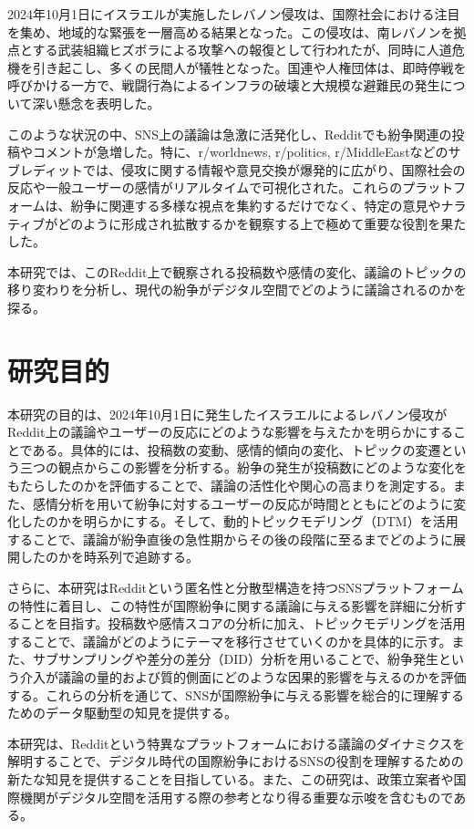 \documentclass[11pt, a4j]{jreport}
\begin{document}
    2024年10月1日にイスラエルが実施したレバノン侵攻は、国際社会における注目を集め、地域的な緊張を一層高める結果となった。この侵攻は、南レバノンを拠点とする武装組織ヒズボラによる攻撃への報復として行われたが、同時に人道危機を引き起こし、多くの民間人が犠牲となった。国連や人権団体は、即時停戦を呼びかける一方で、戦闘行為によるインフラの破壊と大規模な避難民の発生について深い懸念を表明した。

    このような状況の中、SNS上の議論は急激に活発化し、Redditでも紛争関連の投稿やコメントが急増した。特に、r/worldnews, r/politics, r/MiddleEastなどのサブレディットでは、侵攻に関する情報や意見交換が爆発的に広がり、国際社会の反応や一般ユーザーの感情がリアルタイムで可視化された。これらのプラットフォームは、紛争に関連する多様な視点を集約するだけでなく、特定の意見やナラティブがどのように形成され拡散するかを観察する上で極めて重要な役割を果たした。

    本研究では、このReddit上で観察される投稿数や感情の変化、議論のトピックの移り変わりを分析し、現代の紛争がデジタル空間でどのように議論されるのかを探る。

    \section{研究目的}
    本研究の目的は、2024年10月1日に発生したイスラエルによるレバノン侵攻がReddit上の議論やユーザーの反応にどのような影響を与えたかを明らかにすることである。具体的には、投稿数の変動、感情的傾向の変化、トピックの変遷という三つの観点からこの影響を分析する。紛争の発生が投稿数にどのような変化をもたらしたのかを評価することで、議論の活性化や関心の高まりを測定する。また、感情分析を用いて紛争に対するユーザーの反応が時間とともにどのように変化したのかを明らかにする。そして、動的トピックモデリング（DTM）を活用することで、議論が紛争直後の急性期からその後の段階に至るまでどのように展開したのかを時系列で追跡する。
    
    さらに、本研究はRedditという匿名性と分散型構造を持つSNSプラットフォームの特性に着目し、この特性が国際紛争に関する議論に与える影響を詳細に分析することを目指す。投稿数や感情スコアの分析に加え、トピックモデリングを活用することで、議論がどのようにテーマを移行させていくのかを具体的に示す。また、サブサンプリングや差分の差分（DID）分析を用いることで、紛争発生という介入が議論の量的および質的側面にどのような因果的影響を与えるのかを評価する。これらの分析を通じて、SNSが国際紛争に与える影響を総合的に理解するためのデータ駆動型の知見を提供する。
    
    本研究は、Redditという特異なプラットフォームにおける議論のダイナミクスを解明することで、デジタル時代の国際紛争におけるSNSの役割を理解するための新たな知見を提供することを目指している。また、この研究は、政策立案者や国際機関がデジタル空間を活用する際の参考となり得る重要な示唆を含むものである。
\end{document}
